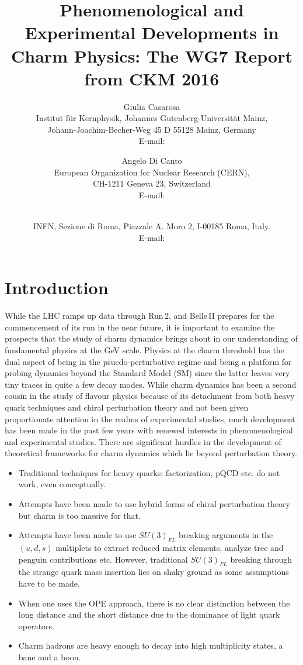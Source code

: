 \documentclass{PoS}
\title{Phenomenological and Experimental Developments in Charm Physics: The WG7 Report from CKM 2016}
\author{Giulia Casarosa\\
        Institut f\"ur Kernphysik, Johannes Gutenberg-Universit\"at Mainz,\\
        Johann-Joachim-Becher-Weg 45 D 55128 Mainz, Germany\\
        E-mail: \email{casarosa@uni-mainz.de}}
\author{Angelo Di Canto\\
        European Organization for Nuclear Research (CERN),\\
        CH-1211 Geneva 23, Switzerland\\
        E-mail: \email{angelo.di.canto@cern.ch}}
\author{\speaker{Ayan Paul}\\
        INFN, Sezione di Roma, Piazzale A. Moro 2, I-00185 Roma, Italy.\\
        E-mail: \email{ayan.paul@roma1.infn.it}}
\begin{document}
\section{Introduction}
\label{sec:intro}

While the LHC ramps up data through Run\,2, and Belle\,II prepares for the commencement of its run in the near future, it is important to examine the prospects that the study of charm dynamics brings about in our understanding of fundamental physics at the GeV scale. Physics at the charm threshold has the dual aspect of being in the psuedo-perturbative regime and being a platform for probing dynamics beyond the Standard Model (SM) since the latter leaves very tiny traces in quite a few decay modes. While charm dynamics has been a second cousin in the study of flavour physics because of its detachment from both heavy quark techniques and chiral perturbation theory and not been given proportionate attention in the realms of experimental studies, much development has been made in the past few years with renewed interests in phenomenological and experimental studies. There are significant hurdles in the development of theoretical frameworks for charm dynamics which lie beyond perturbation theory.
\begin{itemize}
\itemsep0em 
\item Traditional techniques for heavy quarks: factorization, pQCD etc. do not work, even conceptually.
\item Attempts have been made to use hybrid forms of chiral perturbation theory but charm is too massive for that.
\item Attempts have been made to use $SU(3)_{FL}$ breaking arguments in the $(u, d, s)$ multiplets to extract reduced matrix elements, analyze tree and penguin contributions etc. However, traditional $SU(3)_{FL}$ breaking through the strange quark mass insertion lies on shaky ground as some assumptions have to be made.
\item When one uses the OPE approach, there is no clear distinction between the long distance and the short distance due to the dominance of light quark operators.
\item Charm hadrons are heavy enough to decay into high multiplicity states, a bane and a boon.
\end{itemize}
\end{document}
